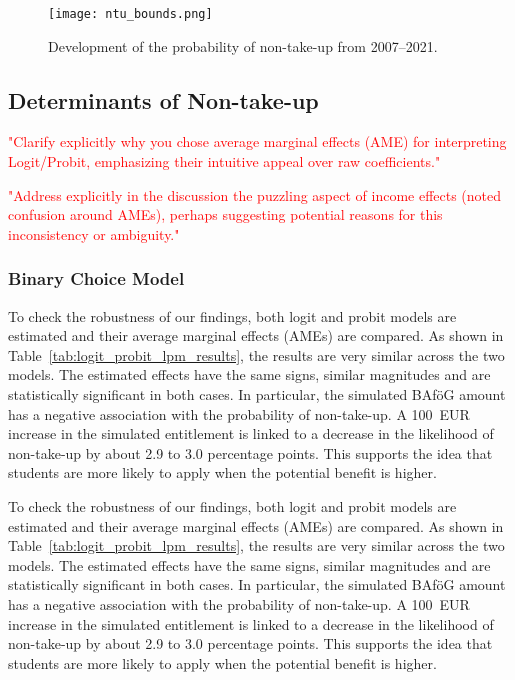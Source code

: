 


\begin{figure}[htbp]
  \centering
  \texttt{[image: ntu\_bounds.png]}
  \caption{Development of the probability of non-take-up from 2007--2021.}
  \label{fig:ntu_bounds_over_years}
\end{figure}


\subsection{Determinants of Non-take-up}


\textcolor{red}{"Clarify explicitly why you chose average marginal effects (AME) for interpreting Logit/Probit, emphasizing their intuitive appeal over raw coefficients."}

\textcolor{red}{"Address explicitly in the discussion the puzzling aspect of income effects (noted confusion around AMEs), perhaps suggesting potential reasons for this inconsistency or ambiguity."}

\subsubsection{Binary Choice Model}

To check the robustness of our findings, both logit and probit models are estimated and their average marginal effects (AMEs) are compared. 
As shown in Table~\ref{tab:logit_probit_lpm_results}, the results are very similar across the two models. 
The estimated effects have the same signs, similar magnitudes and are statistically significant in both cases. 
In particular, the simulated BAföG amount has a negative association with the probability of non-take-up. 
A 100~EUR increase in the simulated entitlement is linked to a decrease in the likelihood of non-take-up by about 2.9 to 3.0 percentage points. 
This supports the idea that students are more likely to apply when the potential benefit is higher.

To check the robustness of our findings, both logit and probit models are estimated and their average marginal effects (AMEs) are compared. As shown in Table~\ref{tab:logit_probit_lpm_results}, the results are very similar across the two models. The estimated effects have the same signs, similar magnitudes and are statistically significant in both cases. In particular, the simulated BAföG amount has a negative association with the probability of non-take-up. A 100~EUR increase in the simulated entitlement is linked to a decrease in the likelihood of non-take-up by about 2.9 to 3.0 percentage points. This supports the idea that students are more likely to apply when the potential benefit is higher.

